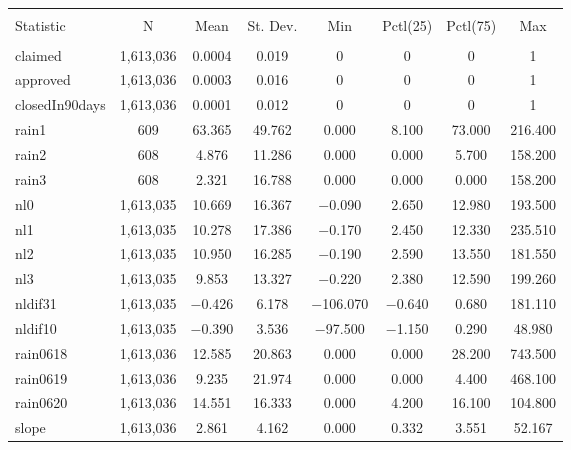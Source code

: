 \documentclass{article}
\begin{document}

\begin{table}[!htbp] \centering 
\caption{} 
\label{} 
\begin{tabular}{@{\extracolsep{5pt}}lccccccc} 
\\[-1.8ex]\hline 
\hline \\[-1.8ex] 
Statistic & \multicolumn{1}{c}{N} & \multicolumn{1}{c}{Mean} & \multicolumn{1}{c}{St. Dev.} & \multicolumn{1}{c}{Min} & \multicolumn{1}{c}{Pctl(25)} & \multicolumn{1}{c}{Pctl(75)} & \multicolumn{1}{c}{Max} \\ 
\hline \\[-1.8ex] 
claimed & 1,613,036 & 0.0004 & 0.019 & 0 & 0 & 0 & 1 \\ 
approved & 1,613,036 & 0.0003 & 0.016 & 0 & 0 & 0 & 1 \\ 
closedIn90days & 1,613,036 & 0.0001 & 0.012 & 0 & 0 & 0 & 1 \\ 
rain1 & 609 & 63.365 & 49.762 & 0.000 & 8.100 & 73.000 & 216.400 \\ 
rain2 & 608 & 4.876 & 11.286 & 0.000 & 0.000 & 5.700 & 158.200 \\ 
rain3 & 608 & 2.321 & 16.788 & 0.000 & 0.000 & 0.000 & 158.200 \\ 
nl0 & 1,613,035 & 10.669 & 16.367 & $-$0.090 & 2.650 & 12.980 & 193.500 \\ 
nl1 & 1,613,035 & 10.278 & 17.386 & $-$0.170 & 2.450 & 12.330 & 235.510 \\ 
nl2 & 1,613,035 & 10.950 & 16.285 & $-$0.190 & 2.590 & 13.550 & 181.550 \\ 
nl3 & 1,613,035 & 9.853 & 13.327 & $-$0.220 & 2.380 & 12.590 & 199.260 \\ 
nldif31 & 1,613,035 & $-$0.426 & 6.178 & $-$106.070 & $-$0.640 & 0.680 & 181.110 \\ 
nldif10 & 1,613,035 & $-$0.390 & 3.536 & $-$97.500 & $-$1.150 & 0.290 & 48.980 \\ 
rain0618 & 1,613,036 & 12.585 & 20.863 & 0.000 & 0.000 & 28.200 & 743.500 \\ 
rain0619 & 1,613,036 & 9.235 & 21.974 & 0.000 & 0.000 & 4.400 & 468.100 \\ 
rain0620 & 1,613,036 & 14.551 & 16.333 & 0.000 & 4.200 & 16.100 & 104.800 \\ 
slope & 1,613,036 & 2.861 & 4.162 & 0.000 & 0.332 & 3.551 & 52.167 \\ 

\end{tabular}
\end{table}
\end{document}
